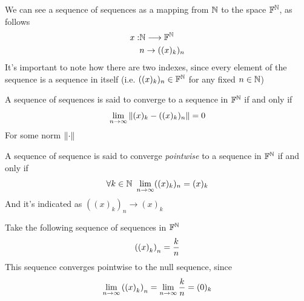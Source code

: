 \documentclass[../complete.tex]{subfiles}
\begin{document}
\begin{dfn}
	We can see a sequence of sequences as a mapping from $\mathbb{N}$ to the space $\mathbb{F}^{\mathbb{N}}$, as follows
	\begin{equation*}
		\begin{aligned}
			x:&\mathbb{N}\overset{}{\longrightarrow}\mathbb{F}^{\mathbb{N}}\\
			&n\to((x)_k)_n
		\end{aligned}
	\end{equation*}
	It's important to note how there are two indexes, since every element of the sequence is a sequence in itself (i.e. $((x)_k)_n\in\mathbb{F}^{\mathbb{N}}$ for any fixed $n\in\mathbb{N}$)
\end{dfn}
\begin{dfn}
	A sequence of sequences is said to converge to a sequence in $\mathbb{F}^{\mathbb{N}}$ if and only if
	\begin{equation}
		\lim_{n\to\infty}\norm{(x)_k-((x)_k)_n}=0
		\label{eq:seqseqconv}
	\end{equation}
	For some norm $\norm{\cdot}$
\end{dfn}
\begin{dfn}
	A sequence of sequence is said to converge \textit{pointwise} to a sequence in $\mathbb{F}^{\mathbb{N}}$ if and only if
	\begin{equation}
		\forall k\in\N\ \lim_{n\to\infty}((x)_k)_n=(x)_k
		\label{eq:pointwiseconvseqseq}
	\end{equation}
	And it's indicated as $((x)_k)_n\to(x)_k$
\end{dfn}
\begin{eg}
	Take the following sequence of sequences in $\mathbb{F}^{\mathbb{N}}$
	\begin{equation*}
		\left(\left(x\right)_{k}\right)_{n}=\frac{k}{n}
	\end{equation*}
	This sequence converges pointwise to the null sequence, since
	\begin{equation*}
		\lim_{n\to\infty}\left(\left(x\right)_{k}\right)_{n}=\lim_{n\to\infty}\frac{k}{n}=(0)_k
	\end{equation*}
\end{eg}
\end{document}

